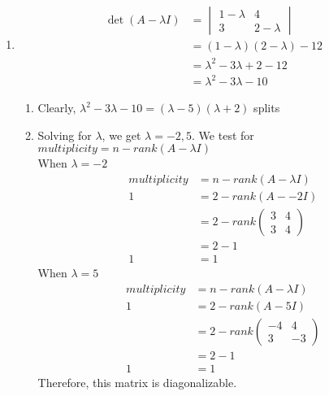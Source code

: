 \documentclass[13pt]{article}
\begin{document}
\begin{enumerate}[label=(\alph*),leftmargin=*]
\item
  \begin{align*}
    \det(A - \lambda I) &=
                          \begin{vmatrix}
                            1 - \lambda & 4 \\
                            3 & 2 - \lambda
                          \end{vmatrix} \\
                        &= (1 - \lambda)(2 - \lambda) - 12 \\
                        &= \lambda^2 - 3\lambda + 2 - 12 \\
                        &= \lambda^2 - 3\lambda - 10
  \end{align*}
  \begin{enumerate}
  \item Clearly, $\lambda^2 - 3\lambda - 10 = (\lambda - 5)(\lambda + 2)$ splits
  \item Solving for $\lambda$, we get $\lambda = -2, 5$. We test for $multiplicity = n - rank(A - \lambda I)$ \\
    When $\lambda = -2$
    \begin{align*}
      multiplicity &= n - rank(A - \lambda I) \\
      1 &= 2 - rank(A - -2 I) \\
                   &= 2 - rank
                     \begin{pmatrix}
                       3 & 4 \\
                       3 & 4
                     \end{pmatrix} \\
                   &= 2 - 1 \\
      1 &= 1
    \end{align*}
    When $\lambda = 5$
    \begin{align*}
      multiplicity &= n - rank(A - \lambda I) \\
      1 &= 2 - rank(A - 5 I) \\
                   &= 2 - rank
                     \begin{pmatrix}
                       -4 & 4 \\
                       3 & -3
                     \end{pmatrix} \\
                   &= 2 - 1 \\
      1 &= 1
    \end{align*}
    Therefore, this matrix is diagonalizable.

\end{enumerate}
\end{enumerate}
\end{document}
